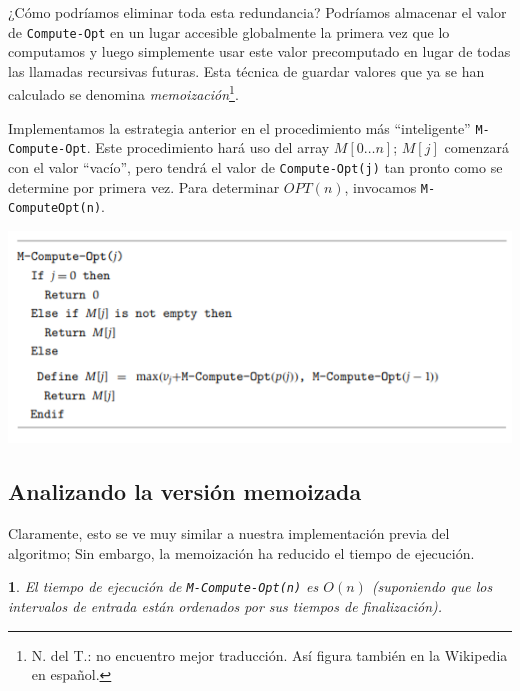 \documentclass[a4paper, 12pt]{book}
\theoremstyle{dotless}
\newtheorem{theorem}{}[section]
\begin{document}
¿Cómo podríamos eliminar toda esta redundancia? Podríamos almacenar el valor de \texttt{Compute-Opt} en un lugar accesible globalmente la primera vez que lo computamos y luego simplemente usar este valor precomputado en lugar de todas las llamadas recursivas futuras. Esta técnica de guardar valores que ya se han calculado se denomina \textit{memoización}\footnote{N. del T.: no encuentro mejor traducción. Así figura también en la Wikipedia en español.}.

Implementamos la estrategia anterior en el procedimiento más ``inteligente'' \texttt{M-Compute-Opt}. Este procedimiento hará uso del array  $M[0\dots n]$; $M[j]$ comenzará con el valor ``vacío'', pero tendrá el valor de \texttt{Compute-Opt(j)} tan pronto como se determine por primera vez. Para determinar $OPT(n)$, invocamos \texttt{M-ComputeOpt(n)}.

\includegraphics[scale=1]{Imagenes-Seccion6/cod6_2.PNG}

\subsection{Analizando la versión memoizada}

Claramente, esto se ve muy similar a nuestra implementación previa del algoritmo; Sin embargo, la memoización ha reducido el tiempo de ejecución.

\noindent\colorbox{mygray}{\parbox{\textwidth}{
\begin{theorem}
El tiempo de ejecución de \texttt{M-Compute-Opt(n)} es $O(n)$ (suponiendo que los intervalos de entrada están ordenados por sus tiempos de finalización).
\end{theorem}
}}
\vspace{8pt}
\end{document}
